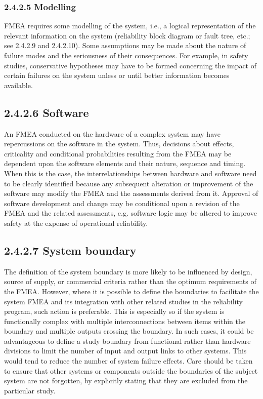 \documentclass[./dissertation.tex]{subfiles}
\begin{document}
\subsubsection{2.4.2.5 Modelling}

FMEA requires some modelling of the system, i.e., a logical representation of the relevant information on the system (reliability block diagram or fault tree, etc.; see 2.4.2.9 and 2.4.2.10). Some assumptions may be made about the nature of failure modes and the seriousness of their consequences. For example, in safety studies, conservative hypotheses may have to be formed concerning the impact of certain failures on the system unless or until better information becomes available.

\subsection{2.4.2.6 Software}

An FMEA conducted on the hardware of a complex system may have repercussions on the software in the system. Thus, decisions about effects, criticality and conditional probabilities resulting from the FMEA may be dependent upon the software elements and their nature, sequence and timing. When this is the case, the interrelationships between hardware and software need to be clearly identified because any subsequent alteration or improvement of the software may modify the FMEA and the assessments derived from it. Approval of software development and change may be conditional upon a revision of the FMEA and the related assessments, e.g. software logic may be altered to improve safety at the expense of operational reliability.

\subsection{2.4.2.7 System boundary}

The definition of the system boundary is more likely to be influenced by design, source of supply, or commercial criteria rather than the optimum requirements of the FMEA. However, where it is possible to define the boundaries to facilitate the system FMEA and its integration with other related studies in the reliability program, such action is preferable. This is especially so if the system is functionally complex with multiple interconnections between items within the boundary and multiple outputs crossing the boundary. In such cases, it could be advantageous to define a study boundary from functional rather than hardware divisions to limit the number of input and output links to other systems. This would tend to reduce the number of system failure effects. Care should be taken to ensure that other systems or components outside the boundaries of the subject system are not forgotten, by explicitly stating that they are excluded from the particular study.
\end{document}
